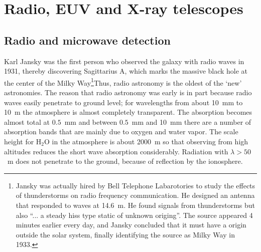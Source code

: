 %
\section{Radio, EUV and X-ray telescopes}

\subsection{Radio and microwave detection}

Karl Jansky was the first person who observed the galaxy with radio waves in 
1931, thereby discovering Sagittarius A, which marks the massive black hole 
at the center of the Milky Way\footnote{Jansky was actually hired by
  Bell Telephone Labarotories to study the effects of thunderstorms on
  radio frequency communication. He designed an antenna that responded
  to waves at 14.6~m. He found signals from thunderstorms but also
  ``... a steady hiss type static of unknown origing''. The source
  appeared 4 minutes earlier every day, and Jansky concluded that it
  must have a origin outside the solar system, finally identifying the
  source as Milky Way in 1933.}Thus, radio astronomy is the 
oldest of the `new' astronomies. The reason
that radio astronomy was early is in part because radio waves easily penetrate
to ground level; for wavelengths from about 10~mm to 10~m the atmosphere is
almost completely transparent. The absorption becomes almost total at 
$0.5$~mm and between $0.5$~mm and 10~mm there are a number of absorption bands
that are mainly due to oxygen and water vapor. The scale height for H$_2$O 
in the atmosphere is about 2000~m so that observing from high altitudes 
reduces the short wave absorption considerably. Radiation with $\lambda>50$~m
does not penetrate to the ground, because of reflection by the ionosphere.

